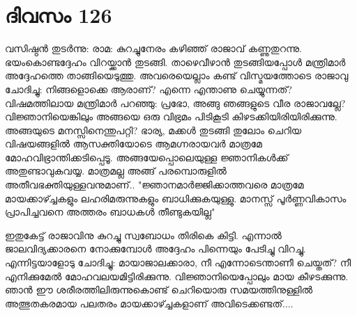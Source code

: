  
\section{ദിവസം 126}


വസിഷ്ഠന്‍ തുടര്‍ന്നു: രാമ: കുറച്ചുനേരം കഴിഞ്ഞ്‌ രാജാവ്‌ കണ്ണുതുറന്നു. ഭയംകൊണ്ടദ്ദേഹം വിറയ്ക്കാന്‍ തുടങ്ങി. താഴെവീഴാന്‍ തുടങ്ങിയപ്പോള്‍ മന്ത്രിമാര്‍ അദ്ദേഹത്തെ താങ്ങിയെടുത്തു. അവരെയെല്ലാം കണ്ട്‌ വിസ്മയത്തോടെ രാജാവു ചോദിച്ചു: നിങ്ങളൊക്കെ ആരാണ്‌? എന്നെ എന്താണു ചെയ്യുന്നത്‌? വിഷമത്തിലായ മന്ത്രിമാര്‍ പറഞ്ഞു: പ്രഭോ, അങ്ങു ഞങ്ങളുടെ വീര രാജാവല്ലേ? വിജ്ഞാനിയെങ്കിലും അങ്ങയെ ഒരു വിഭ്രമം പിടികൂടി കിഴടക്കിയിരിയിരിക്കുന്നു. അങ്ങയുടെ മനസ്സിനെന്തുപറ്റി? ഭാര്യ, മക്കള്‍ തുടങ്ങി തുലോം ചെറിയ വിഷയങ്ങളില്‍ ആസക്തിയോടെ ആമഗ്നരായവര്‍ മാത്രമേ മോഹവിഭ്രാന്തിക്കടിപ്പെടൂ. അങ്ങയേപ്പൊലെയുള്ള ജ്ഞാനികള്‍ക്ക്‌ അതുണ്ടാവുകവയ്യ. മാത്രമല്ല അങ്ങ്‌ പരമ്പൊരുളില്‍ അതീവഭക്തിയുള്ളവനുമാണ്‌.. "ജ്ഞാനമാര്‍ജ്ജിക്കാത്തവരെ മാത്രമേ മായക്കാഴ്ച്ചകളും ലഹരിമരുന്നുകളും ബാധിക്കുകയുള്ളു. മാനസ്സ്‌ പൂര്‍ണ്ണവികാസം പ്രാപിച്ചവനെ അത്തരം ബാധകള്‍ തീണ്ടുകയില്ല"

ഇതുകേട്ട്‌ രാജാവിനു കുറച്ചു സ്വബോധം തിരികെ കിട്ടി. എന്നാല്‍ ജാലവിദ്യക്കാരനെ നോക്കുമ്പോള്‍ അദ്ദേഹം പിന്നെയും പേടിച്ചു വിറച്ചു. എന്നിട്ടയാളോടു ചോദിച്ചു: മായാജാലക്കാരാ, നീ എന്നോടെന്താണീ ചെയ്തത്‌? നീ എനിക്കുമേല്‍ മോഹവലയമിട്ടിരിക്കുന്നു. വിജ്ഞാനിയെപ്പോലും മായ കീഴടക്കുന്നു. ഞാന്‍ ഈ ശരീരത്തിലിരുന്നുകൊണ്ട് ചെറിയൊരു സമയത്തിനുള്ളില്‍  അത്ഭുതകരമായ  പലതരം മായക്കാഴ്ച്ചകളാണ്‌ അവിടെക്കണ്ടത്‌....

